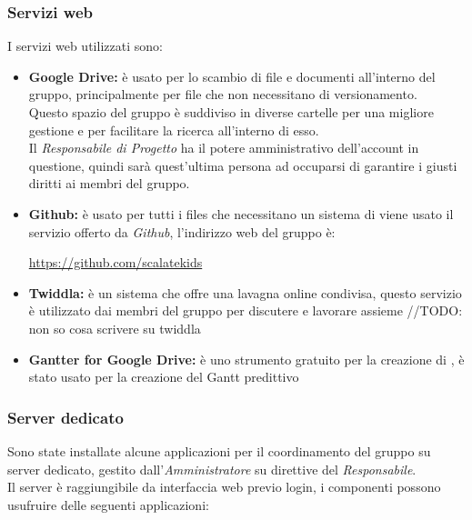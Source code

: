 \documentclass{scalatekids-article}
\begin{document}
\subsubsection{Servizi web}
I servizi web utilizzati sono:
\begin{itemize}
\item\textbf{Google Drive:} è usato per lo scambio di file e documenti all'interno del gruppo, principalmente per file che non necessitano di versionamento.\\
  Questo spazio del gruppo è suddiviso in diverse cartelle per una migliore gestione e per facilitare la ricerca all'interno di esso.\\
  Il \textit{Responsabile di Progetto} ha il potere amministrativo dell'account in questione, quindi sarà quest'ultima persona ad occuparsi di garantire i giusti diritti ai membri del gruppo.
\item\textbf{Github:} è usato per tutti i files che necessitano un sistema di  viene usato il servizio offerto da \textit{Github}, l'indirizzo web del gruppo è:\\
  \begin{center}
    \url{https://github.com/scalatekids}
  \end{center}
\item\textbf{Twiddla:} è un sistema che offre una lavagna online condivisa, questo servizio è utilizzato dai membri del gruppo per discutere e lavorare assieme //TODO: non so cosa scrivere su twiddla
\item\textbf{Gantter for Google Drive:} è uno strumento gratuito per la creazione di , è stato usato per la creazione del Gantt predittivo
\end{itemize}
\subsubsection{Server dedicato}
Sono state installate alcune applicazioni per il coordinamento del gruppo su
server dedicato, gestito dall'\textit{Amministratore} su direttive del
\textit{Responsabile}.\\ Il server è raggiungibile da interfaccia web previo
login, i componenti possono usufruire delle seguenti applicazioni:
\end{document}
